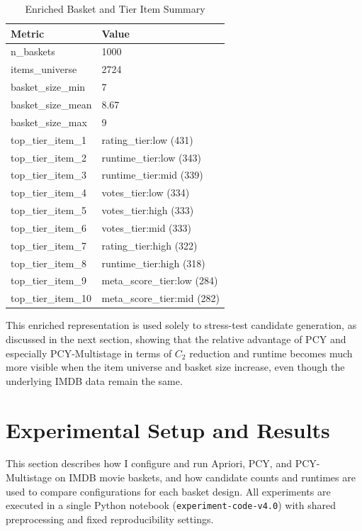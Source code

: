 \documentclass{article}  %
\begin{document}
\begin{table}[!htbp]
    \caption{Enriched Basket and Tier Item Summary}
    \centering
    \begin{tabular}{ll}
        \toprule
        \textbf{Metric} & \textbf{Value} \\
        \midrule
        n\_baskets          & 1000 \\
        items\_universe     & 2724 \\
        basket\_size\_min   & 7 \\
        basket\_size\_mean  & 8.67 \\
        basket\_size\_max   & 9 \\
        top\_tier\_item\_1  & rating\_tier:low (431) \\
        top\_tier\_item\_2  & runtime\_tier:low (343) \\
        top\_tier\_item\_3  & runtime\_tier:mid (339) \\
        top\_tier\_item\_4  & votes\_tier:low (334) \\
        top\_tier\_item\_5  & votes\_tier:high (333) \\
        top\_tier\_item\_6  & votes\_tier:mid (333) \\
        top\_tier\_item\_7  & rating\_tier:high (322) \\
        top\_tier\_item\_8  & runtime\_tier:high (318) \\
        top\_tier\_item\_9  & meta\_score\_tier:low (284) \\
        top\_tier\_item\_10 & meta\_score\_tier:mid (282) \\
        \bottomrule
    \end{tabular}
    \label{tab:7}
\end{table}


This enriched representation is used solely to stress-test candidate generation, as discussed in the next section, showing that the relative advantage of PCY and especially PCY-Multistage in terms of \(C_2\) reduction and runtime becomes much more visible when the item universe and basket size increase, even though the underlying IMDB data remain the same.
 


\FloatBarrier

\section{Experimental Setup and Results}

This section describes how I configure and run Apriori, PCY, and PCY-Multistage on IMDB movie baskets, and how candidate counts and runtimes are used to compare configurations for each basket design. All experiments are executed in a single Python notebook (\texttt{experiment-code-v4.0}) with shared preprocessing and fixed reproducibility settings.
\end{document}
